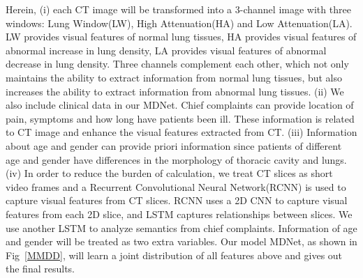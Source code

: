 \documentclass[journal]{IEEEtran}
\begin{document}
Herein, (i) each CT image will be transformed into a 3-channel image with three windows: Lung Window(LW), High Attenuation(HA) and Low Attenuation(LA). LW provides visual features of normal lung tissues, HA provides visual features of abnormal increase in lung density, LA provides visual features of abnormal decrease in lung density. Three channels complement each other, which not only maintains the ability to extract information from normal lung tissues, but also increases the ability to extract information from abnormal lung tissues.
(ii) We also include clinical data in our MDNet. Chief complaints can provide location of pain, symptoms and how long have patients been ill. These information is related to CT image and enhance the visual features extracted from CT. (iii) Information about age and gender can provide priori information since patients of different age and gender have differences in the morphology of thoracic cavity and lungs. (iv) In order to reduce the burden of calculation, we treat CT slices as short video frames and a Recurrent Convolutional Neural Network(RCNN) is used to capture visual features from CT slices. RCNN uses a 2D CNN to capture visual features from each 2D slice, and LSTM captures relationships between slices. We use another LSTM to analyze semantics from chief complaints. Information of age and gender will be treated as two extra variables. Our model MDNet, as shown in Fig~\ref{MMDD}, will learn a joint distribution of all features above and gives out the final results.
\end{document}
